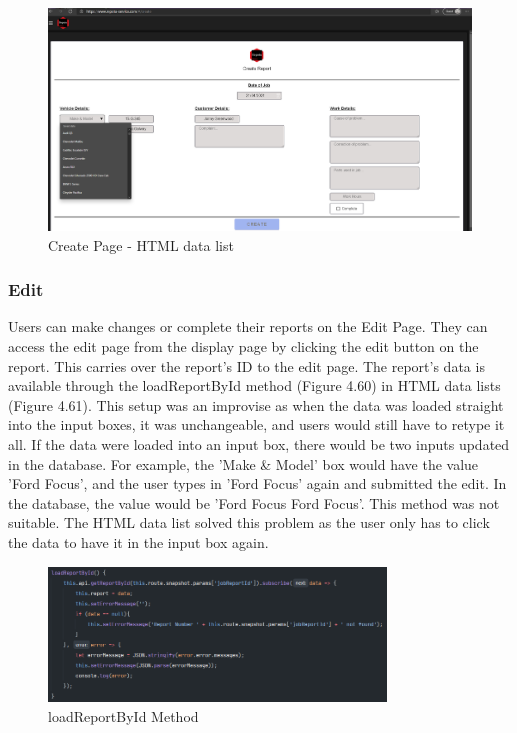 \begin{figure}[H]
    \centering
    \caption{Create Page - HTML data list}
    \label{image:HTMLdatalist}
    \includegraphics[width=1.0\textwidth]{images/repota/UI/create-data.png}
\end{figure}

\subsubsection{Edit}
Users can make changes or complete their reports on the Edit Page. They can access the edit page from the display page by clicking the edit button on the report. This carries over the report's ID to the edit page. The report's data is available through the loadReportById method (Figure 4.60) in HTML data lists (Figure 4.61). This setup was an improvise as when the data was loaded straight into the input boxes, it was unchangeable, and users would still have to retype it all. If the data were loaded into an input box, there would be two inputs updated in the database. For example, the 'Make \& Model' box would have the value 'Ford Focus', and the user types in 'Ford Focus' again and submitted the edit. In the database, the value would be 'Ford Focus Ford Focus'. This method was not suitable. The HTML data list solved this problem as the user only has to click the data to have it in the input box again.

\begin{figure}[H]
    \centering
    \caption{loadReportById Method}
    \label{image:loadReportById}
    \includegraphics[width=0.8\textwidth]{images/repota/report_pages/load_report.png}
\end{figure}

